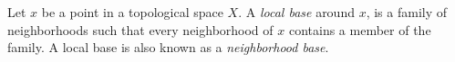 \documentclass[12pt]{article}
\begin{document}
Let $x$ be a point in a topological space $X$. A \emph{local base} around $x$, is a family of neighborhoods such that every neighborhood of $x$ contains a member of the family. A local base is also known as a \emph{neighborhood base}.
\end{document}
